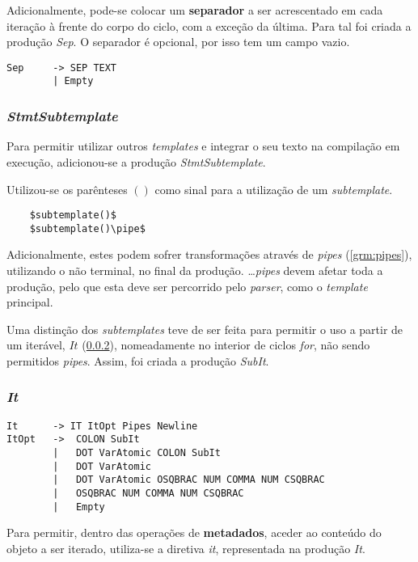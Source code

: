 \documentclass[../relatorio.tex]{subfiles}
\begin{document}
Adicionalmente, pode-se colocar um \textbf{separador} a ser acrescentado
em cada iteração à frente do corpo do ciclo, com a exceção da última.
Para tal foi criada a produção \textit{Sep}.
O separador é opcional, por isso tem um campo vazio.

\begin{verbatim}
Sep     -> SEP TEXT
        | Empty
\end{verbatim}

\subsubsection{\textit{StmtSubtemplate}} \label{grm:sub}
Para permitir utilizar outros \textit{templates} e integrar
o seu texto na compilação em execução, adicionou-se a produção \textit{StmtSubtemplate}.

Utilizou-se os parênteses $()$ como sinal para a utilização de um \textit{subtemplate}.

\begin{verbatim}
    $subtemplate()$
    $subtemplate()\pipe$
\end{verbatim}

Adicionalmente, estes podem sofrer transformações através de \textit{pipes} (\ref{grm:pipes}),
utilizando o não terminal, no final da produção.
\dots \textit{pipes} devem afetar toda a produção, pelo que esta deve ser 
percorrido pelo \textit{parser}, como o \textit{template} principal.

Uma distinção dos \textit{subtemplates}
teve de ser feita para permitir o uso a partir
de um iterável, $It$ (\ref{grm:it}),
nomeadamente no interior de ciclos \textit{for}, não sendo permitidos \textit{pipes}.
Assim, foi criada a produção \textit{SubIt}.

\subsubsection{\textit{It}} \label{grm:it}
\begin{verbatim}
It      -> IT ItOpt Pipes Newline
ItOpt   ->  COLON SubIt                                
        |   DOT VarAtomic COLON SubIt                        
        |   DOT VarAtomic                                    
        |   DOT VarAtomic OSQBRAC NUM COMMA NUM CSQBRAC      
        |   OSQBRAC NUM COMMA NUM CSQBRAC              
        |   Empty  
\end{verbatim}
Para permitir, dentro das operações de \textbf{metadados}, aceder ao conteúdo do objeto
a ser iterado, utiliza-se a diretiva \textit{it},
representada na produção \textit{It}.
\end{document}
